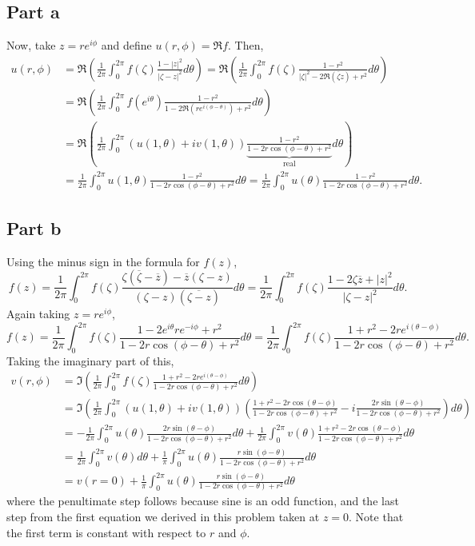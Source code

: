\documentclass{article}
\begin{document}
\subsection{Part a}
Now, take $z=re^{i\phi}$ and define $u(r,\phi)=\Re f$. Then, 
\begin{align*}
u(r,\phi)&=\Re\left(\frac{1}{2\pi}\int_0^{2\pi}f(\zeta)\frac{1-|z|^2}{|\zeta-z|^2}d\theta\right)=\Re\left(\frac{1}{2\pi}\int_0^{2\pi}f(\zeta)\frac{1-r^2}{|\zeta|^2-2\Re(\overline{\zeta}z)+r^2}d\theta\right)\\&=
\Re\left(\frac{1}{2\pi}\int_0^{2\pi}f(e^{i\theta})\frac{1-r^2}{1-2\Re(re^{i(\phi-\theta)})+r^2}d\theta\right)\\&=
\Re\left(\frac{1}{2\pi}\int_0^{2\pi}(u(1,\theta)+iv(1,\theta))\underbrace{\frac{1-r^2}{1-2r\cos(\phi-\theta)+r^2}}_{\text{real}}d\theta\right)\\&=
\frac{1}{2\pi}\int_0^{2\pi}u(1,\theta)\frac{1-r^2}{1-2r\cos(\phi-\theta)+r^2}d\theta=\frac{1}{2\pi}\int_0^{2\pi}u(\theta)\frac{1-r^2}{1-2r\cos(\phi-\theta)+r^2}d\theta.
\end{align*}
\subsection{Part b}
Using the minus sign in the formula for $f(z)$, 
\[
f(z)=\frac{1}{2\pi}\int_0^{2\pi}f(\zeta)\frac{\zeta(\overline{\zeta}-\overline{z})-\overline{z}(\zeta-z)}{(\zeta-z)(\overline{\zeta-z})}d\theta=\frac{1}{2\pi}\int_0^{2\pi}f(\zeta)\frac{1-2\zeta\overline{z}+|z|^2}{|\zeta-z|^2}d\theta.
\]
Again taking $z=re^{i\phi}$,
\[
f(z)=\frac{1}{2\pi}\int_0^{2\pi}f(\zeta)\frac{1-2e^{i\theta}re^{-i\phi}+r^2}{1-2r\cos(\phi-\theta)+r^2}d\theta=\frac{1}{2\pi}\int_0^{2\pi}f(\zeta)\frac{1+r^2-2re^{i(\theta-\phi)}}{1-2r\cos(\phi-\theta)+r^2}d\theta.
\]
Taking the imaginary part of this, 
\begin{align*}
v(r,\phi)&=\Im\left(\frac{1}{2\pi}\int_0^{2\pi}f(\zeta)\frac{1+r^2-2re^{i(\theta-\phi)}}{1-2r\cos(\phi-\theta)+r^2}d\theta\right)\\&=
\Im\left(\frac{1}{2\pi}\int_0^{2\pi}(u(1,\theta)+iv(1,\theta))\left(\frac{1+r^2-2r\cos(\theta-\phi)}{1-2r\cos(\phi-\theta)+r^2}-i\frac{2r\sin(\theta-\phi)}{1-2r\cos(\phi-\theta)+r^2}\right)d\theta\right)\\&=
-\frac{1}{2\pi}\int_0^{2\pi}u(\theta)\frac{2r\sin(\theta-\phi)}{1-2r\cos(\phi-\theta)+r^2}d\theta+\frac{1}{2\pi}\int_0^{2\pi}v(\theta)\frac{1+r^2-2r\cos(\theta-\phi)}{1-2r\cos(\phi-\theta)+r^2}d\theta\\&=
\frac{1}{2\pi}\int_0^{2\pi}v(\theta)d\theta+\frac{1}{\pi}\int_0^{2\pi}u(\theta)\frac{r\sin(\phi-\theta)}{1-2r\cos(\phi-\theta)+r^2}d\theta\\&=
v(r=0)+\frac{1}{\pi}\int_0^{2\pi}u(\theta)\frac{r\sin(\phi-\theta)}{1-2r\cos(\phi-\theta)+r^2}d\theta
\end{align*}
where the penultimate step follows because sine is an odd function, and the last step from the first equation we derived in this problem taken at $z=0$. Note that the first term is constant with respect to $r$ and $\phi$.
\end{document}
